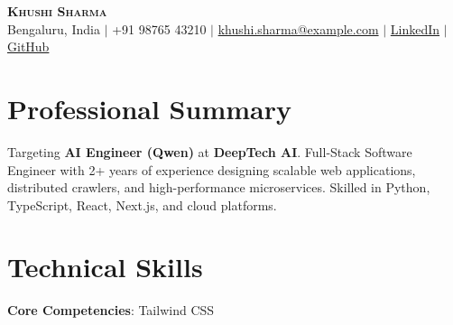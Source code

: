 \documentclass[letterpaper,10pt]{article}
\begin{document}
\begin{center}
    \textbf{\Huge \scshape Khushi Sharma} \\ \vspace{2pt}
    \small Bengaluru, India $|$ +91 98765 43210 $|$ \href{mailto:khushi.sharma@example.com}{khushi.sharma@example.com} $|$ \href{https://linkedin.com/in/khushi-sharma}{LinkedIn} $|$ \href{https://github.com/khushi-sharma}{GitHub}
\end{center}

\section{Professional Summary}
\small{Targeting \textbf{AI Engineer (Qwen)} at \textbf{DeepTech AI}. Full-Stack Software Engineer with 2+ years of experience designing scalable web applications, distributed crawlers, and high-performance microservices. Skilled in Python, TypeScript, React, Next.js, and cloud platforms.}

\section{Technical Skills}
\begin{itemize}[leftmargin=0.15in, label={}]
    \small{\item{
     \textbf{Core Competencies}{: Tailwind CSS}
    }}
\end{itemize}

\end{document}
